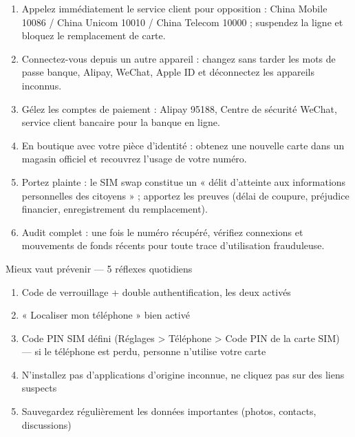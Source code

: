 \begin{enumerate}
  \item Appelez immédiatement le service client pour opposition : China Mobile 10086 / China Unicom 10010 / China Telecom 10000 ; suspendez la ligne et bloquez le remplacement de carte.
  \item Connectez-vous depuis un autre appareil : changez sans tarder les mots de passe banque, Alipay, WeChat, Apple ID et déconnectez les appareils inconnus.
  \item Gélez les comptes de paiement : Alipay 95188, Centre de sécurité WeChat, service client bancaire pour la banque en ligne.
  \item En boutique avec votre pièce d'identité : obtenez une nouvelle carte dans un magasin officiel et recouvrez l'usage de votre numéro.
  \item Portez plainte : le SIM swap constitue un « délit d'atteinte aux informations personnelles des citoyens » ; apportez les preuves (délai de coupure, préjudice financier, enregistrement du remplacement).
  \item Audit complet : une fois le numéro récupéré, vérifiez connexions et mouvements de fonds récents pour toute trace d'utilisation frauduleuse.
\end{enumerate}

\begin{tcbwarn}{Mieux vaut prévenir — 5 réflexes quotidiens}
\begin{enumerate}
  \item Code de verrouillage + double authentification, les deux activés
  \item « Localiser mon téléphone » bien activé
  \item Code PIN SIM défini (Réglages > Téléphone > Code PIN de la carte SIM) — si le téléphone est perdu, personne n'utilise votre carte
  \item N'installez pas d'applications d'origine inconnue, ne cliquez pas sur des liens suspects
  \item Sauvegardez régulièrement les données importantes (photos, contacts, discussions)
\end{enumerate}

\end{tcbwarn}

